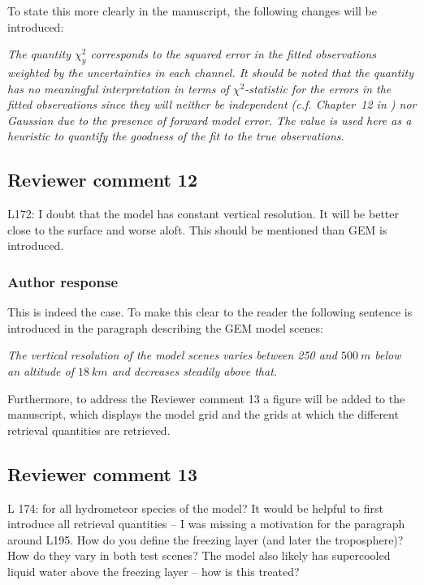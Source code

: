 \documentclass[11pt]{scrartcl}
\begin{document}
To state this more clearly in the manuscript, the following changes will be introduced:

{\itshape The quantity $\chi^2_y$ corresponds to the squared error in the fitted
  observations weighted by the uncertainties in each channel. It should be noted
  that the quantity has no meaningful interpretation in terms of
  $\chi^2$-statistic for the errors in the fitted observations since they will
  neither be independent (c.f. Chapter~12 in \cite{rodgers00}) nor Gaussian due
  to the presence of forward model error. The value is used here as a heuristic
  to quantify the goodness of the fit to the true observations.}


\subsection*{Reviewer comment 12}
L172: I doubt that the model has constant vertical resolution.  It will be better close to the surface and worse aloft. This should be mentioned than GEM is introduced.

\subsubsection*{Author response}

This is indeed the case. To make this clear to the reader the following sentence
is introduced in the paragraph describing the GEM model scenes:

{\itshape The vertical resolution of the model scenes varies between 250
and $500\ \unit{m}$ below an altitude of $18\ \unit{km}$ and decreases
steadily above that.}

Furthermore, to address the Reviewer comment 13 a figure will be added to
the manuscript, which displays the model grid and the grids at which
the different retrieval quantities are retrieved.

\subsection*{Reviewer comment 13}

L 174: for all hydrometeor species of the model? It would be helpful to first
introduce all retrieval quantities – I was missing a motivation for the
paragraph around L195. How do you define the freezing layer (and later the
troposphere)? How do they vary in both test scenes? The model also likely has
supercooled liquid water above the freezing layer – how is this treated?
\end{document}
